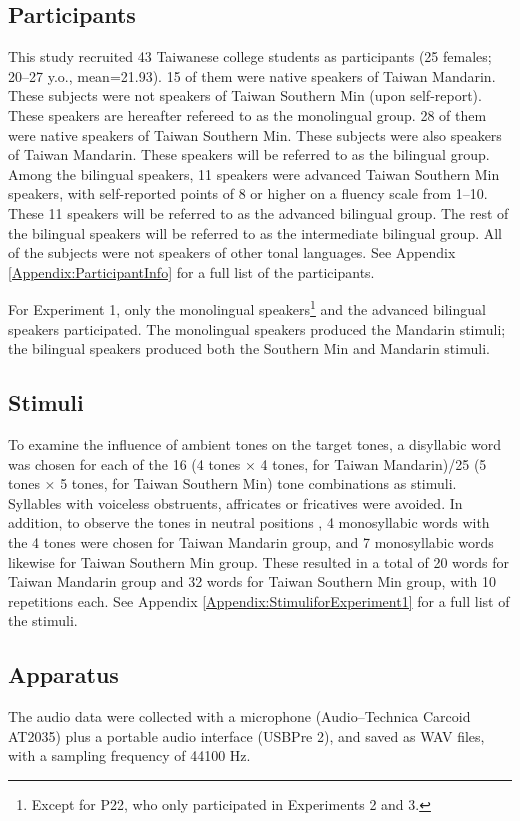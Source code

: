 \subsection{Participants}

This study recruited 43 Taiwanese college students as participants (25 females; 20–27 y.o., mean=21.93). 15 of them were native speakers of Taiwan Mandarin. These subjects were not speakers of Taiwan Southern Min (upon self-report). These speakers are hereafter refereed to as the monolingual group. 28 of them were native speakers of Taiwan Southern Min. These subjects were also speakers of Taiwan Mandarin. These speakers will be referred to as the bilingual group. Among the bilingual speakers, 11 speakers were advanced Taiwan Southern Min speakers, with self-reported points of 8 or higher on a fluency scale from 1–10. These 11 speakers will be referred to as the advanced bilingual group. The rest of the bilingual speakers will be referred to as the intermediate bilingual group. All of the subjects were not speakers of other tonal languages. See Appendix \ref{Appendix:ParticipantInfo} for a full list of the participants. 

For Experiment 1, only the monolingual speakers\footnote{Except for P22, who only participated in Experiments 2 and 3.} and the advanced bilingual speakers participated. The monolingual speakers produced the Mandarin stimuli; the bilingual speakers produced both the Southern Min and Mandarin stimuli.

\subsection{Stimuli}
To examine the influence of ambient tones on the target tones, a disyllabic word was chosen for each of the 16 (4 tones × 4 tones, for Taiwan Mandarin)/25 (5 tones × 5 tones\footnotemark, for Taiwan Southern Min) tone combinations as stimuli. Syllables with voiceless obstruents, affricates or fricatives were avoided. In addition, to observe the tones in neutral positions , 4 monosyllabic words with the 4 tones were chosen for Taiwan Mandarin group, and 7 monosyllabic words likewise for Taiwan Southern Min group. These resulted in a total of 20 words for Taiwan Mandarin group and 32 words for Taiwan Southern Min group, with 10 repetitions each. See Appendix \ref{Appendix:StimuliforExperiment1} for a full list of the stimuli.


\subsection{Apparatus}
The audio data were collected with a microphone (Audio–Technica Carcoid AT2035) plus a portable audio interface (USBPre 2), and saved as WAV files, with a sampling frequency of 44100 Hz.

